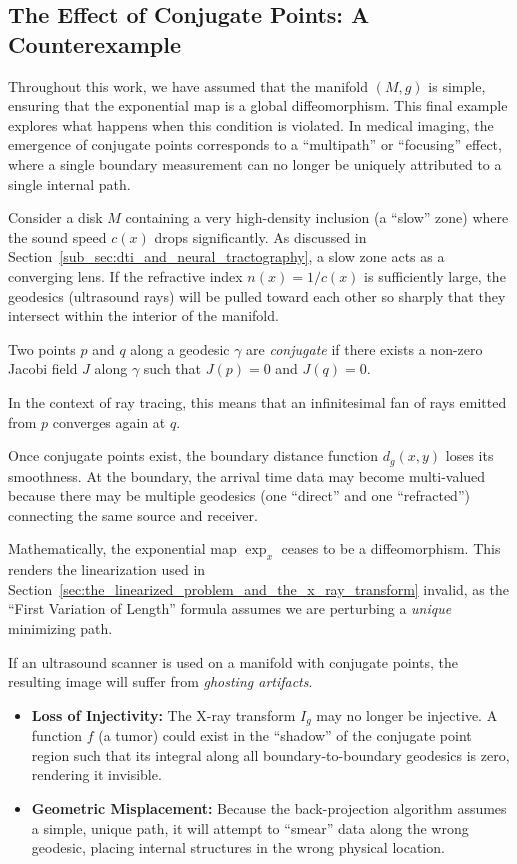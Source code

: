 \subsection{The Effect of Conjugate Points: A Counterexample}

Throughout this work, we have assumed that the manifold $(M, g)$ is simple, ensuring that the exponential map is a global diffeomorphism. This final example explores what happens when this condition is violated. In medical imaging, the emergence of conjugate points corresponds to a ``multipath'' or ``focusing'' effect, where a single boundary measurement can no longer be uniquely attributed to a single internal path.

Consider a disk $M$ containing a very high-density inclusion (a ``slow'' zone) where the sound speed $c(x)$ drops significantly. As discussed in Section~\ref{sub_sec:dti_and_neural_tractography}, a slow zone acts as a converging lens. If the refractive index $n(x) = 1/c(x)$ is sufficiently large, the geodesics (ultrasound rays) will be pulled toward each other so sharply that they intersect within the interior of the manifold.

\begin{definition}
  Two points $p$ and $q$ along a geodesic $\gamma$ are \emph{conjugate} if there exists a non-zero Jacobi field $J$ along $\gamma$ such that $J(p) = 0$ and $J(q) = 0$.
\end{definition}

In the context of ray tracing, this means that an infinitesimal fan of rays emitted from $p$ converges again at $q$.

Once conjugate points exist, the boundary distance function $d_g(x, y)$ loses its smoothness. At the boundary, the arrival time data may become multi-valued because there may be multiple geodesics (one ``direct'' and one ``refracted'') connecting the same source and receiver.

Mathematically, the exponential map $\exp_x$ ceases to be a diffeomorphism. This renders the linearization used in Section~\ref{sec:the_linearized_problem_and_the_x_ray_transform} invalid, as the ``First Variation of Length'' formula assumes we are perturbing a \textit{unique} minimizing path.

If an ultrasound scanner is used on a manifold with conjugate points, the resulting image will suffer from \emph{ghosting artifacts}.
\begin{itemize}
  \item \textbf{Loss of Injectivity:} The X-ray transform $I_g$ may no longer be injective. A function $f$ (a tumor) could exist in the ``shadow'' of the conjugate point region such that its integral along all boundary-to-boundary geodesics is zero, rendering it invisible.
  \item \textbf{Geometric Misplacement:} Because the back-projection algorithm assumes a simple, unique path, it will attempt to ``smear'' data along the wrong geodesic, placing internal structures in the wrong physical location.
\end{itemize}

